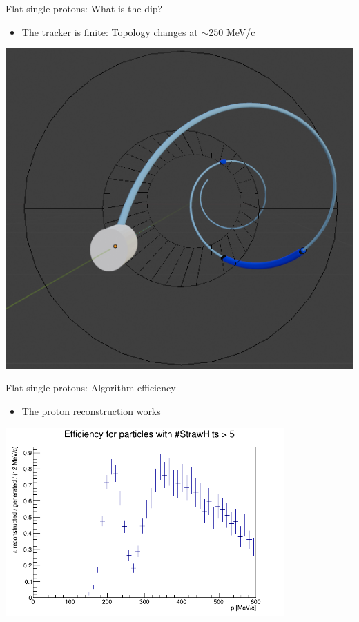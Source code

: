 \documentclass[10pt]{beamer}
\begin{document}
%
\begin{frame}{Flat single protons: What is the dip?}
\begin{itemize}
\item The tracker is finite: Topology changes at $\sim 250$ MeV/c
\end{itemize}
\begin{center}
\includegraphics[scale=0.7]{Blender_Tracker_4}
\end{center}
\end{frame}

%
\begin{frame}{Flat single protons: Algorithm efficiency}
\begin{itemize}
\item The proton reconstruction works
\end{itemize}
\begin{center}
\includegraphics[width=0.8\textwidth]{plots/flat/Lambda_eff_trk0-5hits}
\end{center}
\end{frame}
\end{document}
